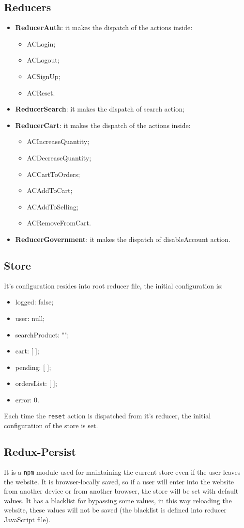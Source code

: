 \subsection{Reducers}
\begin{itemize}
	\item \textbf{ReducerAuth}: it makes the dispatch of the actions inside:
	\begin{itemize}
		\item ACLogin;
		\item ACLogout;
		\item ACSignUp;
		\item ACReset.
	\end{itemize}
	\item \textbf{ReducerSearch}: it makes the dispatch of search action;
	\item \textbf{ReducerCart}: it makes the dispatch of the actions inside:
	\begin{itemize}
		\item ACIncreaseQuantity;
		\item ACDecreaseQuantity;
		\item ACCartToOrders;
		\item ACAddToCart;
		\item ACAddToSelling;
		\item ACRemoveFromCart.
	\end{itemize}
	\item \textbf{ReducerGovernment}: it makes the dispatch of disableAccount action.
\end{itemize}
\subsection{Store}
It's configuration resides into root reducer file, the initial configuration is:
\begin{itemize}
	\item logged: false;
	\item user: null;
	\item searchProduct: "";
	\item cart: [ ];
	\item pending: [ ];
	\item ordersList: [ ];
	\item error: 0.
\end{itemize}
Each time the \texttt{reset} action is dispatched from it's reducer, the initial configuration of the store is set.

\subsection{Redux-Persist}
It is a \texttt{npm} module used for maintaining the current store even if the user leaves the website. It is browser-locally saved, so if a user will enter into the website from another device or from another browser, the store will be set with default values. It has a blacklist for bypassing some values, in this way reloading the website, these values will not be saved (the blacklist is defined into reducer JavaScript file).

